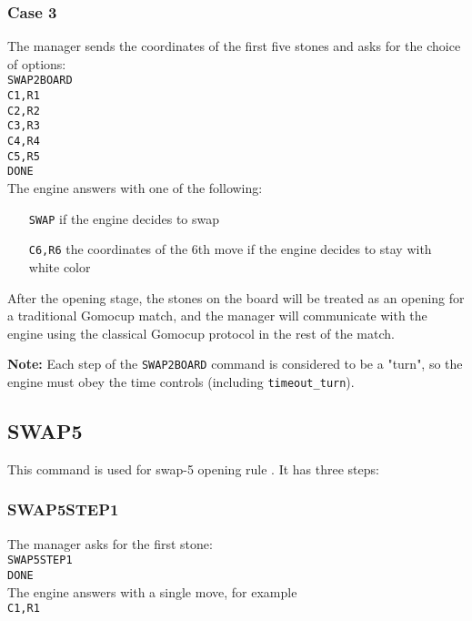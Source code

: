\documentclass[12pt,a4paper]{article}
\begin{document}
\subsubsection{Case 3}
The manager sends the coordinates of the first five stones and asks for the choice of options:\\
\texttt{SWAP2BOARD}\\
\texttt{C1,R1}\\
\texttt{C2,R2}\\
\texttt{C3,R3}\\
\texttt{C4,R4}\\
\texttt{C5,R5}\\
\texttt{DONE}\\
The engine answers with one of the following:
\begin{enumerate}[leftmargin=7.5em]
\item[\texttt{SWAP}]{if the engine decides to swap}
\item[\texttt{C6,R6}]{the coordinates of the 6th move if the engine decides to stay with white color}
\end{enumerate}

After the opening stage, the stones on the board will be treated as an opening for a traditional Gomocup match, and the manager will communicate with the engine using the classical Gomocup protocol in the rest of the match.

\textbf{Note:} Each step of the \texttt{SWAP2BOARD} command is considered to be a "turn", so the engine must obey the time controls (including \texttt{timeout{\_}turn}).


\subsection{SWAP5}
\label{cmd_swap5}
This command is used for swap-5 opening rule \cite{renju_opening_rules}. It has three steps:

\subsubsection{SWAP5STEP1}
The manager asks for the first stone:\\
\texttt{SWAP5STEP1}\\
\texttt{DONE}\\
The engine answers with a single move, for example\\
\texttt{C1,R1}
\end{document}
